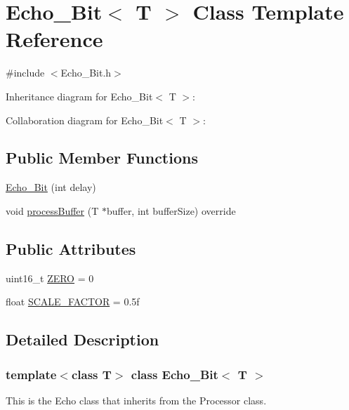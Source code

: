 \hypertarget{classEcho__16Bit}{}\section{Echo\+\_\+Bit$<$ T $>$ Class Template Reference}
\label{classEcho__16Bit}


{\ttfamily \#include $<$Echo\+\_\+Bit.\+h$>$}



Inheritance diagram for Echo\+\_\+Bit$<$ T $>$\+:


Collaboration diagram for Echo\+\_\+Bit$<$ T $>$\+:
\subsection*{Public Member Functions}
\begin{DoxyCompactItemize}
\item 
\hyperlink{classEcho__16Bit_a2de1f2cafb7b8412ce98597351f8bf2c}{Echo\+\_\+Bit} (int delay)
\item 
void \hyperlink{classEcho__16Bit_ac3ba5af13a6bc7c62c6efa932ebd6f48}{process\+Buffer} (T $\ast$buffer, int buffer\+Size) override
\end{DoxyCompactItemize}
\subsection*{Public Attributes}
\begin{DoxyCompactItemize}
\item 
uint16\+\_\+t \hyperlink{classEcho__16Bit_a82049f08fac39a845a18d72b5a1fe09c}{Z\+E\+RO} = 0
\item 
float \hyperlink{classEcho__16Bit_af2b0a9612ef321a85fc2a1362720ba94}{S\+C\+A\+L\+E\+\_\+\+F\+A\+C\+T\+OR} = 0.\+5f
\end{DoxyCompactItemize}


\subsection{Detailed Description}
\subsubsection*{template$<$class T$>$\newline
class Echo\+\_\+Bit$<$ T $>$}

This is the Echo class that inherits from the Processor class. 

